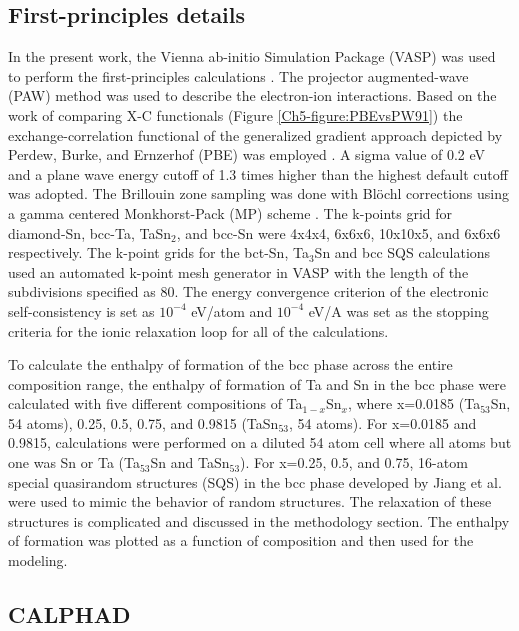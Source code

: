 \subsection{First-principles details}

In the present work, the Vienna ab-initio Simulation Package (VASP) was used to perform the first-principles calculations \cite{Kresse1996}. The projector augmented-wave (PAW) \cite{Kresse1999,Blochl1994} method was used to describe the electron-ion interactions. Based on the work of comparing X-C functionals (Figure \ref{Ch5-figure:PBEvsPW91}) the exchange-correlation functional of the generalized gradient approach depicted by Perdew, Burke, and Ernzerhof (PBE) was employed \cite{Perdew1996a}. A sigma value of 0.2 eV and a plane wave energy cutoff of 1.3 times higher than the highest default cutoff was adopted. The Brillouin zone sampling was done with Bl\"ochl corrections \cite{Blochl1994} using a gamma centered Monkhorst-Pack (MP) scheme \cite{Monkhorst1976a}. The k-points grid for diamond-Sn, bcc-Ta, TaSn$_2$, and bcc-Sn were 4x4x4, 6x6x6, 10x10x5, and 6x6x6 respectively. The k-point grids for the bct-Sn, Ta$_3$Sn and bcc SQS calculations used an automated k-point mesh generator in VASP with the length of the subdivisions specified as 80. The energy convergence criterion of the electronic self-consistency is set as $10^{-4}$ eV/atom and $10^{-4}$ eV/A was set as the stopping criteria for the ionic relaxation loop for all of the calculations. 

To calculate the enthalpy of formation of the bcc phase across the entire composition range, the enthalpy of formation of Ta and Sn in the bcc phase were calculated with five different compositions of Ta$_{1-x}$Sn$_{x}$, where x=0.0185 (Ta$_{53}$Sn, 54 atoms), 0.25, 0.5, 0.75, and 0.9815 (TaSn$_{53}$, 54 atoms). For x=0.0185 and 0.9815, calculations were performed on a diluted 54 atom cell where all atoms but one was Sn or Ta (Ta$_{53}$Sn and TaSn$_{53}$). For x=0.25, 0.5, and 0.75, 16-atom special quasirandom structures (SQS) in the bcc phase developed by Jiang et al. \cite{Jiang2004} were used to mimic the behavior of random structures. The relaxation of these structures is complicated and discussed in the methodology section. The enthalpy of formation was plotted as a function of composition and then used for the modeling.  

\subsection{CALPHAD}

